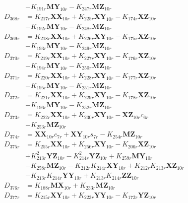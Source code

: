 \begin{multicols}{2}
\begin{align}
&- K_{191r}\mathbf{MY}_{10r} - K_{247r}\mathbf{MZ}_{10r} \nonumber \\
D_{368r} &= K_{217r}\mathbf{XX}_{10r} + K_{225r}\mathbf{XY}_{10r} - K_{174r}\mathbf{XZ}_{10r}  \nonumber \\
&- K_{192r}\mathbf{MY}_{10r} - K_{248r}\mathbf{MZ}_{10r} \nonumber \\
D_{369r} &= K_{218r}\mathbf{XX}_{10r} + K_{226r}\mathbf{XY}_{10r} - K_{175r}\mathbf{XZ}_{10r}  \nonumber \\
&- K_{193r}\mathbf{MY}_{10r} - K_{249r}\mathbf{MZ}_{10r} \nonumber \\
D_{370r} &= K_{219r}\mathbf{XX}_{10r} + K_{227r}\mathbf{XY}_{10r} - K_{176r}\mathbf{XZ}_{10r}  \nonumber \\
&- K_{194r}\mathbf{MY}_{10r} - K_{250r}\mathbf{MZ}_{10r} \nonumber \\
D_{371r} &= K_{220r}\mathbf{XX}_{10r} + K_{228r}\mathbf{XY}_{10r} - K_{177r}\mathbf{XZ}_{10r}  \nonumber \\
&- K_{195r}\mathbf{MY}_{10r} - K_{251r}\mathbf{MZ}_{10r} \nonumber \\
D_{372r} &= K_{221r}\mathbf{XX}_{10r} + K_{229r}\mathbf{XY}_{10r} - K_{178r}\mathbf{XZ}_{10r}  \nonumber \\
&- K_{196r}\mathbf{MY}_{10r} - K_{252r}\mathbf{MZ}_{10r} \nonumber \\
D_{373r} &= K_{222r}\mathbf{XX}_{10r} + K_{230r}\mathbf{XY}_{10r} - \mathbf{XZ}_{10r}c_{6r}  \nonumber \\
&- K_{253r}\mathbf{MZ}_{10r} \nonumber \\
D_{374r} &= \mathbf{XX}_{10r}c_{7r} + \mathbf{XY}_{10r}s_{7r} - K_{254r}\mathbf{MZ}_{10r} \nonumber \\
D_{375r} &= K_{255r}\mathbf{XX}_{10r} + K_{256r}\mathbf{XY}_{10r} - K_{206r}\mathbf{XZ}_{10r}  \nonumber \\
&+ K_{213r}^2\mathbf{YZ}_{10r} - K_{214r}^2\mathbf{YZ}_{10r} + K_{259r}\mathbf{MY}_{10r}  \nonumber \\
&- K_{258r}\mathbf{MZ}_{10r} - K_{212r}K_{214r}\mathbf{XY}_{10r} + K_{212r}K_{213r}\mathbf{XZ}_{10r}  \nonumber \\
&- K_{213r}K_{214r}\mathbf{YY}_{10r} + K_{213r}K_{214r}\mathbf{ZZ}_{10r} \nonumber \\
D_{376r} &= K_{188r}\mathbf{MX}_{10r} + K_{233r}\mathbf{MZ}_{10r} \nonumber \\
D_{377r} &= K_{215r}\mathbf{XY}_{10r} + K_{223r}\mathbf{YY}_{10r} - K_{172r}\mathbf{YZ}_{10r}  \nonumber \\

\end{align}
\end{multicols}
